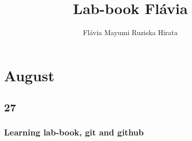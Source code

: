 \documentclass[a4paper, 12pt, titlepage]{report}
\title{Lab-book Flávia\\}
\author{Flávia Mayumi Ruziska Hirata }
\date{}
\begin{document}
\maketitle

\chapter{August}
\section{27}
\subsection{Learning lab-book, git and github}
\printbibliography
\end{document}

